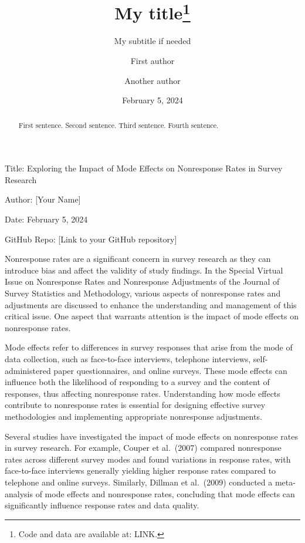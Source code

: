 \documentclass[
  letterpaper,
  DIV=11,
  numbers=noendperiod]{scrartcl}
\title{My title\thanks{Code and data are available at: LINK.}}
\subtitle{My subtitle if needed}
\author{First author \and Another author}
\date{February 5, 2024}
\begin{document}
\maketitle
\begin{abstract}
First sentence. Second sentence. Third sentence. Fourth sentence.
\end{abstract}
\ifdefined\Shaded\renewenvironment{Shaded}{\begin{tcolorbox}[interior hidden, boxrule=0pt, borderline west={3pt}{0pt}{shadecolor}, breakable, enhanced, frame hidden, sharp corners]}{\end{tcolorbox}}\fi

Title: Exploring the Impact of Mode Effects on Nonresponse Rates in
Survey Research

Author: {[}Your Name{]}

Date: February 5, 2024

GitHub Repo: {[}Link to your GitHub repository{]}

Nonresponse rates are a significant concern in survey research as they
can introduce bias and affect the validity of study findings. In the
Special Virtual Issue on Nonresponse Rates and Nonresponse Adjustments
of the Journal of Survey Statistics and Methodology, various aspects of
nonresponse rates and adjustments are discussed to enhance the
understanding and management of this critical issue. One aspect that
warrants attention is the impact of mode effects on nonresponse rates.

Mode effects refer to differences in survey responses that arise from
the mode of data collection, such as face-to-face interviews, telephone
interviews, self-administered paper questionnaires, and online surveys.
These mode effects can influence both the likelihood of responding to a
survey and the content of responses, thus affecting nonresponse rates.
Understanding how mode effects contribute to nonresponse rates is
essential for designing effective survey methodologies and implementing
appropriate nonresponse adjustments.

Several studies have investigated the impact of mode effects on
nonresponse rates in survey research. For example, Couper et al.~(2007)
compared nonresponse rates across different survey modes and found
variations in response rates, with face-to-face interviews generally
yielding higher response rates compared to telephone and online surveys.
Similarly, Dillman et al.~(2009) conducted a meta-analysis of mode
effects and nonresponse rates, concluding that mode effects can
significantly influence response rates and data quality.
\end{document}
